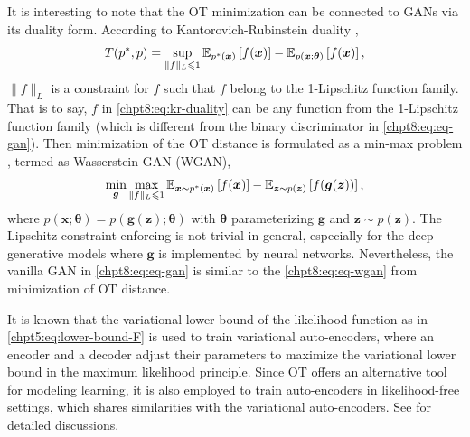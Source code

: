 \begin{remark}\label{chpt8:rmk:wgan}
  It is interesting to note that the OT minimization can be connected to GANs via its duality form. According to Kantorovich-Rubinstein duality \cite[Section~2.4]{2018arXiv180300567P}\cite{villani2008optimal},
  \begin{equation}\label{chpt8:eq:kr-duality}
     T(p^{\ast},p) = \sup_{\|f\|_{L} \leqslant 1} \mathbb{E}_{p^{\ast}(\bm{x})}\left[ f(\bm{x}) \right] -
  \mathbb{E}_{p(\bm{x};\bm{\theta})}\left[ f(\bm{x}) \right],
\end{equation}
$\|f\|_L$ is a constraint for $f$ such that $f$ belong to the 1-Lipschitz function
family. That is to say, $f$ in \eqref{chpt8:eq:kr-duality} can be any function from the 1-Lipschitz function
family (which is different from the binary discriminator in \eqref{chpt8:eq:eq-gan}). Then minimization of the OT distance is formulated as a min-max problem \cite{2017arXiv170107875A}, termed as Wasserstein GAN (WGAN),
\begin{equation}\label{chpt8:eq:eq-wgan}
  \min_{\bm{g}} \max_{\|f\|_{L} \leqslant 1} \mathbb{E}_{\bm{x} \sim p^{\ast}(\bm{x})}\left[ f(\bm{x}) \right] -
  \mathbb{E}_{\bm{z}\sim p(\bm{z})}\left[ f(\bm{g}(\bm{z})) \right],
\end{equation}
where $p(\bm{x};\bm{\theta}) = p(\bm{g}(\bm{z}); \bm{\theta})$ with $\bm{\theta}$ parameterizing $\bm{g}$ and $\bm{z}\sim p(\bm{z})$. The  Lipschitz constraint enforcing is not trivial in general, especially for the deep generative models where $\bm{g}$ is implemented by neural networks. Nevertheless, the vanilla GAN in \eqref{chpt8:eq:eq-gan} is similar to the \eqref{chpt8:eq:eq-wgan} from minimization of OT distance.
\end{remark}

\begin{remark}
It is known that the variational lower bound of the likelihood function as in \eqref{chpt5:eq:lower-bound-F} is used to train variational auto-encoders, where an encoder and a decoder adjust their parameters to maximize the variational lower bound in the maximum likelihood principle. Since OT offers an alternative tool for modeling learning, it is also employed to train auto-encoders in likelihood-free settings, which shares similarities with the variational auto-encoders. See \cite{patrini2018sinkhornVAE, genevay2017gan,bousquet2017optimal, ambrogioni2018wasserstein} for detailed discussions.
\end{remark}

